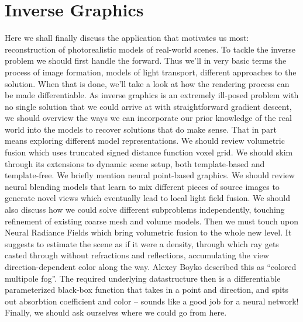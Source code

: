 \chapter{Inverse Graphics}

Here we shall finally discuss the application that motivates us most:
reconstruction of photorealistic models of real-world scenes. To tackle the
inverse problem we should first handle the forward. Thus we'll in very basic
terms the process of image formation, models of light transport, different
approaches to the solution. When that is done, we'll take a look at how the
rendering process can be made differentiable. As inverse graphics is an
extremely ill-posed problem with no single solution that we could arrive at
with straightforward gradient descent, we should overview the ways we can
incorporate our prior knowledge of the real world into the models to recover
solutions that do make sense. That in part means exploring different model
representations. We should review volumetric fusion which uses truncated signed
distance function voxel grid. We should skim through its extensions to dynamic
scene setup, both template-based and template-free. We briefly mention neural
point-based graphics.  We should review neural blending models that learn to
mix different pieces of source images to generate novel views which eventually
lead to local light field fusion. We should also discuss how we could solve
different subproblems independently, touching refinement of existing coarse
mesh and volume models.  Then we must touch upon Neural Radiance Fields which
bring volumetric fusion to the whole new level. It suggests to estimate the
scene as if it were a density, through which ray gets casted through without
refractions and reflections, accumulating the view direction-dependent color
along the way.  Alexey Boyko described this as ``colored multipole fog''. The
required underlying datastructure then is a differentiable parameterized
black-box function that takes in a point and direction, and spits out
absorbtion coefficient and color -- sounds like a good job for a neural
network!  Finally, we should ask ourselves where we could go from here.
